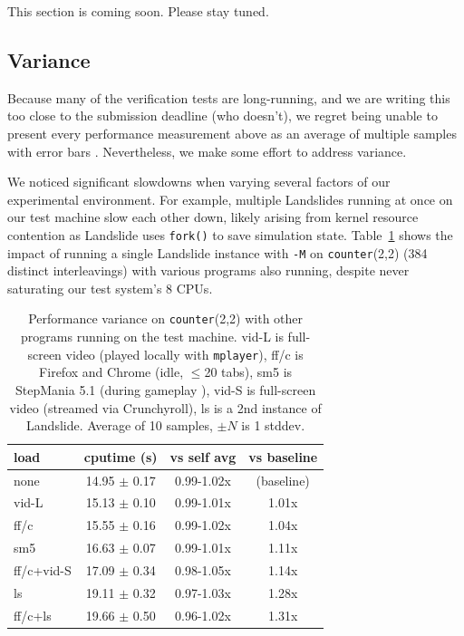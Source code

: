 \documentclass[10pt]{sigplanconf}
\begin{document}
This section is coming soon. Please stay tuned.

\subsection{Variance}

Because many of the verification tests are long-running,
and we are writing this too close to the submission deadline (who doesn't),
we regret being unable to present every performance measurement above
as an average of multiple samples with error bars \cite{epsilon}.
Nevertheless, we make some effort to address variance.

We noticed significant slowdowns when varying several factors of our experimental environment.
For example, multiple Landslides running at once on our test machine slow each other down,
likely arising from kernel resource contention as Landslide uses {\tt fork()} to save simulation state.
Table~\ref{tab:variants} shows the impact of running a single Landslide instance with {\tt -M} on
{\tt counter}(2,2) (384 distinct interleavings)
with various programs also running, despite never saturating our test system's 8 CPUs.

\begin{table}[t]
	\begin{center}
	\begin{tabular}{l|c|c|c}
		load & cputime (s) & vs self avg & vs baseline \\
		\hline
		{\sf none	} & 14.95 $\pm$ 0.17	& 0.99-1.02x	& (baseline)	\\
		{\sf vid-L	} & 15.13 $\pm$ 0.10	& 0.99-1.01x	& 1.01x	\\
		{\sf ff/c	} & 15.55 $\pm$ 0.16	& 0.99-1.02x	& 1.04x	\\
		{\sf sm5	} & 16.63 $\pm$ 0.07	& 0.99-1.01x	& 1.11x \\
		{\sf ff/c+vid-S	} & 17.09 $\pm$ 0.34	& 0.98-1.05x	& 1.14x	\\
		{\sf ls		} & 19.11 $\pm$ 0.32	& 0.97-1.03x	& 1.28x	\\
		{\sf ff/c+ls	} & 19.66 $\pm$ 0.50	& 0.96-1.02x	& 1.31x	\\
	\end{tabular}
	\end{center}
	\caption{Performance variance on {\tt counter}(2,2) with other programs running on the test machine.
		{\sf vid-L} is full-screen video (played locally with {\tt mplayer}),
		{\sf ff/c} is Firefox and Chrome (idle, $\le$20 tabs),
		{\sf sm5} is StepMania 5.1 (during gameplay \cite{itg2}),
		{\sf vid-S} is full-screen video (streamed via Crunchyroll),
		{\sf ls} is a 2nd instance of Landslide.
		Average of 10 samples, $\pm N$ is 1 stddev.
	}
	\label{tab:variants}
\end{table}
\end{document}

